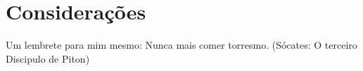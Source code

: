 \section{Considerações}

Um lembrete para mim mesmo: Nunca mais comer torresmo. 
(Sócates: O terceiro Discipulo de Piton)